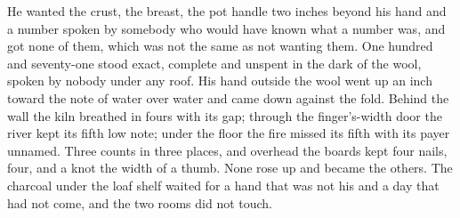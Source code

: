 He wanted the crust, the breast, the pot handle two inches beyond his hand and a number spoken by somebody who would have known what a number was, and got none of them, which was not the same as not wanting them. One hundred and seventy-one stood exact, complete and unspent in the dark of the wool, spoken by nobody under any roof. His hand outside the wool went up an inch toward the note of water over water and came down against the fold. Behind the wall the kiln breathed in fours with its gap; through the finger's-width door the river kept its fifth low note; under the floor the fire missed its fifth with its payer unnamed. Three counts in three places, and overhead the boards kept four nails, four, and a knot the width of a thumb. None rose up and became the others. The charcoal under the loaf shelf waited for a hand that was not his and a day that had not come, and the two rooms did not touch.
